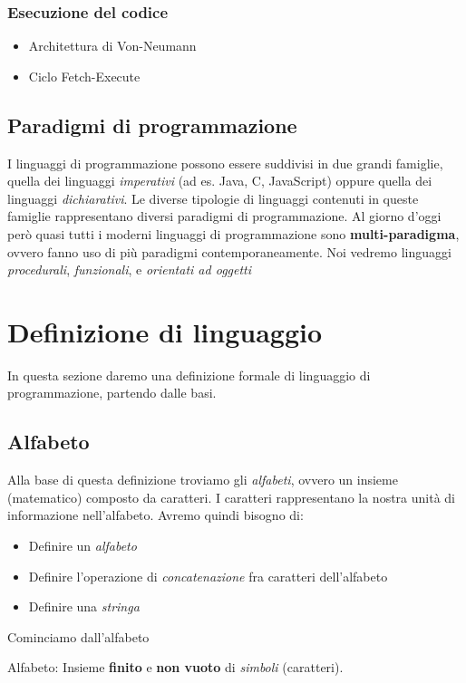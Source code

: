 \documentclass{article}
\begin{document}
\subsubsection{Esecuzione del codice}
\begin{itemize}
    \item Architettura di Von-Neumann
    \item Ciclo Fetch-Execute
\end{itemize}

\subsection{Paradigmi di programmazione}
I linguaggi di programmazione possono essere suddivisi in due grandi famiglie, quella dei linguaggi \emph{imperativi} (ad es. Java, C, JavaScript) oppure quella dei linguaggi \emph{dichiarativi}. Le diverse tipologie di linguaggi contenuti in queste famiglie rappresentano diversi paradigmi di programmazione.
Al giorno d'oggi però quasi tutti i moderni linguaggi di programmazione sono \textbf{multi-paradigma}, ovvero fanno uso di più paradigmi contemporaneamente. Noi vedremo linguaggi \emph{procedurali}, \emph{funzionali}, e \emph{orientati ad oggetti}

\pagebreak %

\section{Definizione di linguaggio}
In questa sezione daremo una definizione formale di linguaggio di programmazione, partendo dalle basi.

\subsection{Alfabeto}
Alla base di questa definizione troviamo gli \emph{alfabeti}, ovvero un insieme (matematico) composto da caratteri. I caratteri rappresentano la nostra unità di informazione nell'alfabeto. Avremo quindi bisogno di:
\begin{itemize}
    \item Definire un \emph{alfabeto}
    \item Definire l'operazione di \emph{concatenazione} fra caratteri dell'alfabeto
    \item Definire una \emph{stringa}
\end{itemize}
Cominciamo dall'alfabeto
\begin{dfn}{Alfabeto: }
    Insieme \textbf{finito} e \textbf{non vuoto} di \emph{simboli} (caratteri).
\end{dfn}
\end{document}
